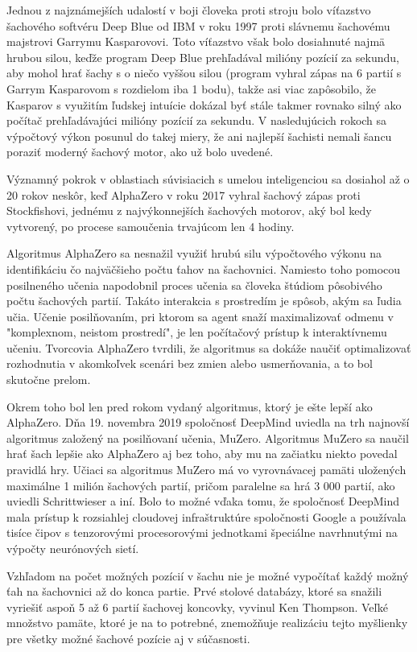 \documentclass[10pt,twoside,slovak,a4paper]{article}
\begin{document}
Jednou z najznámejších udalostí v boji človeka proti stroju bolo víťazstvo šachového softvéru Deep Blue od IBM v roku 1997 proti slávnemu šachovému majstrovi Garrymu Kasparovovi. Toto víťazstvo však bolo dosiahnuté najmä hrubou silou, keďže program Deep Blue prehľadával milióny pozícií za sekundu, aby mohol hrať šachy s o niečo vyššou silou (program vyhral zápas na 6 partií s Garrym Kasparovom s rozdielom iba 1 bodu), takže asi viac zapôsobilo, že Kasparov s využitím ľudskej intuície dokázal byť stále takmer rovnako silný ako počítač prehľadávajúci milióny pozícií za sekundu. V nasledujúcich rokoch sa výpočtový výkon posunul do takej miery, že ani najlepší šachisti nemali šancu poraziť moderný šachový motor, ako už bolo uvedené.

Významný pokrok v oblastiach súvisiacich s umelou inteligenciou sa dosiahol až o 20 rokov neskôr, keď AlphaZero v roku 2017 vyhral šachový zápas proti Stockfishovi, jednému z najvýkonnejších šachových motorov, aký bol kedy vytvorený, po procese samoučenia trvajúcom len 4 hodiny.

Algoritmus AlphaZero sa nesnažil využiť hrubú silu výpočtového výkonu na identifikáciu čo najväčšieho počtu ťahov na šachovnici. Namiesto toho pomocou posilneného učenia napodobnil proces učenia sa človeka štúdiom pôsobivého počtu šachových partií. Takáto interakcia s prostredím je spôsob, akým sa ľudia učia. Učenie posilňovaním, pri ktorom sa agent snaží maximalizovať odmenu v "komplexnom, neistom prostredí", je len počítačový prístup k interaktívnemu učeniu. Tvorcovia AlphaZero tvrdili, že algoritmus sa dokáže naučiť optimalizovať rozhodnutia v akomkoľvek scenári bez zmien alebo usmerňovania, a to bol skutočne prelom.

Okrem toho bol len pred rokom vydaný algoritmus, ktorý je ešte lepší ako AlphaZero. Dňa 19. novembra 2019 spoločnosť DeepMind uviedla na trh najnovší algoritmus založený na posilňovaní učenia, MuZero. Algoritmus MuZero sa naučil hrať šach lepšie ako AlphaZero aj bez toho, aby mu na začiatku niekto povedal pravidlá hry. Učiaci sa algoritmus MuZero má vo vyrovnávacej pamäti uložených maximálne 1 milión šachových partií, pričom paralelne sa hrá 3 000 partií, ako uviedli Schrittwieser a iní. Bolo to možné vďaka tomu, že spoločnosť DeepMind mala prístup k rozsiahlej cloudovej infraštruktúre spoločnosti Google a používala tisíce čipov s tenzorovými procesorovými jednotkami špeciálne navrhnutými na výpočty neurónových sietí.

Vzhľadom na počet možných pozícií v šachu nie je možné vypočítať každý možný ťah na šachovnici až do konca partie. Prvé stolové databázy, ktoré sa snažili vyriešiť aspoň 5 až 6 partií šachovej koncovky, vyvinul Ken Thompson. Veľké množstvo pamäte, ktoré je na to potrebné, znemožňuje realizáciu tejto myšlienky pre všetky možné šachové pozície aj v súčasnosti.
\end{document}
